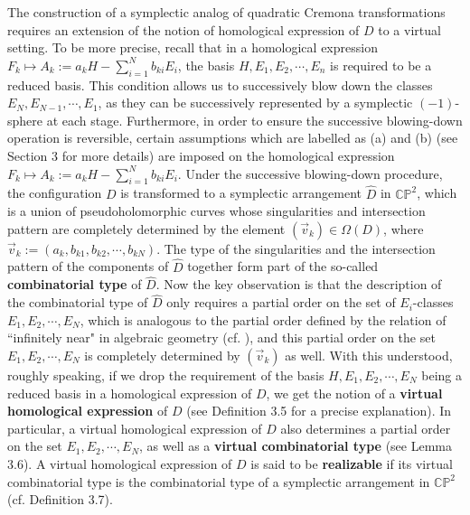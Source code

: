 \documentclass[11pt]{amsart}
\theoremstyle{plain}
\numberwithin{theorem}{section}
\theoremstyle{definition}
\newcommand{\C}{{\mathbb C}}
\renewcommand{\P}{{\mathbb P}}
\begin{document}
The construction of a symplectic analog of quadratic Cremona transformations requires an extension of the notion of homological expression of $D$ to a virtual setting. To be more precise, recall that in a homological expression
$F_k\mapsto A_k:=a_k H-\sum_{i=1}^N b_{ki} E_i$, the basis $H,E_1,E_2,\cdots,E_n$ is required to be a reduced basis. This condition allows us to successively blow down the classes $E_N,E_{N-1}, \cdots, E_1$, as they can be successively represented by a symplectic $(-1)$-sphere at each stage. Furthermore, in order to ensure the successive blowing-down operation is reversible, certain assumptions which are labelled as (a) and (b) (see Section 3 for more details) are imposed on the homological expression $F_k\mapsto A_k:=a_k H-\sum_{i=1}^N b_{ki} E_i$. Under the successive blowing-down procedure, the configuration $D$ is transformed to a symplectic arrangement 
$\hat{D}$ in $\C\P^2$, which is a union of pseudoholomorphic curves whose singularities and intersection pattern are completely determined by the element $(\vec{v}_k)\in \Omega(D)$, 
where $\vec{v}_k:=(a_k,b_{k1},b_{k2},\cdots,b_{kN})$. 
The type of the singularities and the intersection pattern of the components of $\hat{D}$ together form part of 
the so-called {\bf combinatorial type} of $\hat{D}$. Now the key observation is that the description of the combinatorial type of 
$\hat{D}$ only requires a partial order on the set of $E_i$-classes $E_1,E_2,\cdots,E_N$, which is analogous to the partial order defined by the relation of ``infinitely near" in algebraic geometry (cf. \cite{Bea}), and this partial order
on the set $E_1,E_2,\cdots,E_N$ is completely determined by $(\vec{v}_k)$ as well. With this understood, roughly speaking, if we drop the requirement of the basis $H,E_1,E_2,\cdots, E_N$ being a 
reduced basis in a homological expression of $D$, we get the notion of a {\bf virtual homological expression} of $D$ 
(see Definition 3.5 for a precise explanation). In particular, a virtual homological expression of $D$ also determines a partial order on the set $E_1,E_2,\cdots,E_N$, as well as a {\bf virtual combinatorial type} (see Lemma 3.6). A virtual homological expression of $D$ is said to be {\bf realizable} if its virtual combinatorial type is the combinatorial type of a symplectic arrangement in $\C\P^2$ (cf. Definition 3.7). 
\end{document}
